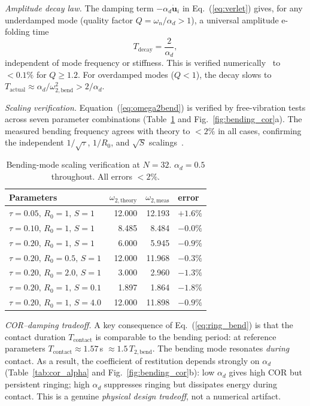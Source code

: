 \documentclass[aps,pre,twocolumn,floatfix,longbibliography]{revtex4-2}
\begin{document}
\textit{Amplitude decay law.}
The damping term $-\alpha_d \dot{\mathbf{u}}_i$ in
Eq.~(\ref{eq:verlet}) gives, for any underdamped mode (quality factor
$Q = \omega_n/\alpha_d > 1$), a universal amplitude
e-folding time
\begin{equation}
  T_\text{decay} = \frac{2}{\alpha_d},
\label{eq:Tdecay}
\end{equation}
independent of mode frequency or stiffness.  This is verified
numerically~\cite{dampcalib_code} to $< 0.1\%$ for $Q \geq 1.2$.
For overdamped modes ($Q < 1$), the decay slows to
$T_\text{actual} \approx \alpha_d/\omega_{2,\text{bend}}^2 > 2/\alpha_d$.

\textit{Scaling verification.}
Equation~(\ref{eq:omega2bend}) is verified by free-vibration tests
across seven parameter combinations (Table~\ref{tab:damp_scaling} and
Fig.~\ref{fig:bending_cor}a).  The measured bending frequency agrees
with theory to $< 2\%$ in all cases, confirming the independent
$1/\sqrt{\tau}$, $1/R_0$, and $\sqrt{S}$ scalings~\cite{dampcalib_code}.

\begin{table}[htb]
\caption{Bending-mode scaling verification at $N = 32$.
  $\alpha_d = 0.5$ throughout.  All errors $< 2\%$.}
\label{tab:damp_scaling}
\begin{ruledtabular}
\begin{tabular}{lrrl}
  Parameters & $\omega_{2,\text{theory}}$ & $\omega_{2,\text{meas}}$ & error \\
\hline
  $\tau{=}0.05,\,R_0{=}1,\,S{=}1$ & 12.000 & 12.193 & $+1.6\%$ \\
  $\tau{=}0.10,\,R_0{=}1,\,S{=}1$ &  8.485 &  8.484 & $-0.0\%$ \\
  $\tau{=}0.20,\,R_0{=}1,\,S{=}1$ &  6.000 &  5.945 & $-0.9\%$ \\
  $\tau{=}0.20,\,R_0{=}0.5,\,S{=}1$ & 12.000 & 11.968 & $-0.3\%$ \\
  $\tau{=}0.20,\,R_0{=}2.0,\,S{=}1$ &  3.000 &  2.960 & $-1.3\%$ \\
  $\tau{=}0.20,\,R_0{=}1,\,S{=}0.1$ &  1.897 &  1.864 & $-1.8\%$ \\
  $\tau{=}0.20,\,R_0{=}1,\,S{=}4.0$ & 12.000 & 11.898 & $-0.9\%$ \\
\end{tabular}
\end{ruledtabular}
\end{table}

\textit{COR--damping tradeoff.}
A key consequence of Eq.~(\ref{eq:ring_bend}) is that the contact duration
$T_\text{contact}$ is comparable to the bending period: at reference parameters
$T_\text{contact} \approx 1.57$\,s $\approx 1.5\,T_{2,\text{bend}}$.  The
bending mode resonates \emph{during} contact.  As a result, the coefficient
of restitution depends strongly on $\alpha_d$ (Table~\ref{tab:cor_alpha} and
Fig.~\ref{fig:bending_cor}b): low $\alpha_d$ gives high COR but persistent
ringing; high $\alpha_d$ suppresses ringing but dissipates energy during contact.
This is a genuine \emph{physical design tradeoff}, not a numerical artifact.
\end{document}
